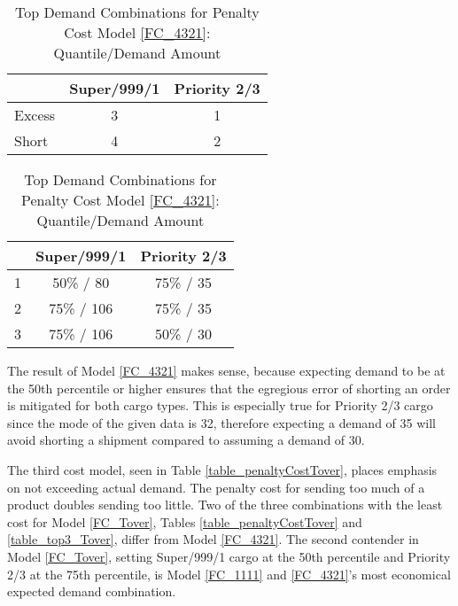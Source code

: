 \begin{table}[H]
\centering
\begin{minipage}[b]{0.4\textwidth}
\caption{Penalty Cost Model \ref{FC_4321}}
\label{table_penaltyCost1}
\begin{tabular}{@{}lcc@{}}
\toprule
 & Super/999/1 & Priority 2/3 \\ \midrule
Excess & 3 & 1 \\
Short & 4 & 2 \\ \bottomrule
\end{tabular}
\end{minipage}
\hspace{10mm}
\begin{minipage}[b]{0.4\textwidth}
\caption{Top Demand Combinations for Penalty Cost Model \ref{FC_4321}: Quantile/Demand Amount}
\label{table_top3_1}
\begin{tabular}{@{}lcc@{}}
\toprule
 & Super/999/1 & Priority 2/3 \\ \midrule
1 & 50\% / 80 & 75\% / 35 \\
2 & 75\% / 106 & 75\% / 35 \\
3 & 75\% / 106 & 50\% / 30 \\ \bottomrule
\end{tabular}
\end{minipage}
\end{table}
The result of Model \ref{FC_4321} makes sense, because expecting demand to be at the 50th percentile or higher ensures that the egregious error of shorting an order is mitigated for both cargo types. This is especially true for Priority 2/3 cargo since the mode of the given data is 32, therefore expecting a demand of 35 will avoid shorting a shipment compared to assuming a demand of 30. \par
The third cost model, seen in Table \ref{table_penaltyCostTover}, places emphasis on not exceeding actual demand. The penalty cost for sending too much of a product doubles sending too little. Two of the three combinations with the least cost for Model\label{FC_Tover} \ref{FC_Tover}, Tables \ref{table_penaltyCostTover} and \ref{table_top3_Tover}, differ from Model \ref{FC_4321}. The second contender in Model \ref{FC_Tover}, setting Super/999/1 cargo at the 50th percentile and Priority 2/3 at the 75th percentile, is Model \ref{FC_1111} and \ref{FC_4321}'s most economical expected demand combination. 

